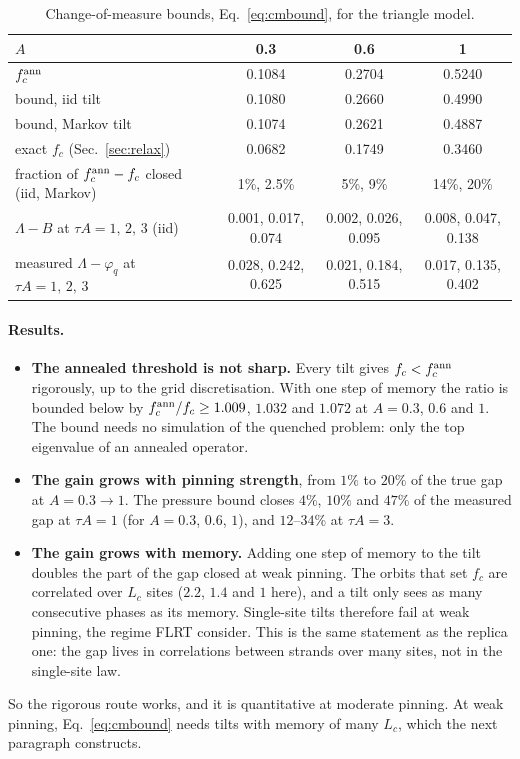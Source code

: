 \documentclass[10pt,a4paper]{article}
\begin{document}
\begin{table}[H]
\centering\footnotesize
\begin{tabular}{lccc}
\toprule
$A$ & 0.3 & 0.6 & 1 \\
\midrule
$f_c^{\rm ann}$ & 0.1084 & 0.2704 & 0.5240 \\
bound, iid tilt & 0.1080 & 0.2660 & 0.4990 \\
bound, Markov tilt & 0.1074 & 0.2621 & 0.4887 \\
exact $f_c$ (Sec.~\ref{sec:relax}) & 0.0682 & 0.1749 & 0.3460 \\
fraction of $f_c^{\rm ann}-f_c$ closed (iid, Markov) & 1\%, 2.5\% & 5\%, 9\% & 14\%, 20\% \\
\midrule
$\Lambda-B$ at $\tau A=1,\,2,\,3$ (iid) & 0.001, 0.017, 0.074 & 0.002, 0.026, 0.095 & 0.008, 0.047, 0.138 \\
measured $\Lambda-\varphi_q$ at $\tau A=1,\,2,\,3$ & 0.028, 0.242, 0.625 & 0.021, 0.184, 0.515 & 0.017, 0.135, 0.402 \\
\bottomrule
\end{tabular}
\caption{Change-of-measure bounds, Eq.~\eqref{eq:cmbound}, for the triangle model.}
\label{tab:cmbound}
\end{table}

\paragraph{Results.}
\begin{itemize}
\item \textbf{The annealed threshold is not sharp.} Every tilt gives $f_c<f_c^{\rm ann}$ rigorously, up to the grid discretisation. With one step of memory the ratio is bounded below by $f_c^{\rm ann}/f_c\ge1.009$, $1.032$ and $1.072$ at $A=0.3$, $0.6$ and $1$. The bound needs no simulation of the quenched problem: only the top eigenvalue of an annealed operator.
\item \textbf{The gain grows with pinning strength}, from $1\%$ to $20\%$ of the true gap at $A=0.3\to1$. The pressure bound closes $4\%$, $10\%$ and $47\%$ of the measured gap at $\tau A=1$ (for $A=0.3$, $0.6$, $1$), and $12$--$34\%$ at $\tau A=3$.
\item \textbf{The gain grows with memory.} Adding one step of memory to the tilt doubles the part of the gap closed at weak pinning. The orbits that set $f_c$ are correlated over $L_c$ sites ($2.2$, $1.4$ and $1$ here), and a tilt only sees as many consecutive phases as its memory. Single-site tilts therefore fail at weak pinning, the regime FLRT consider. This is the same statement as the replica one: the gap lives in correlations between strands over many sites, not in the single-site law.
\end{itemize}
So the rigorous route works, and it is quantitative at moderate pinning. At weak pinning, Eq.~\eqref{eq:cmbound} needs tilts with memory of many $L_c$, which the next paragraph constructs.
\end{document}
